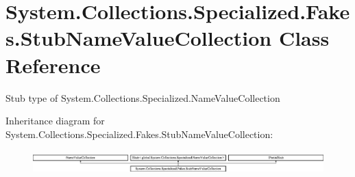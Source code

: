 \hypertarget{class_system_1_1_collections_1_1_specialized_1_1_fakes_1_1_stub_name_value_collection}{\section{System.\-Collections.\-Specialized.\-Fakes.\-Stub\-Name\-Value\-Collection Class Reference}
\label{class_system_1_1_collections_1_1_specialized_1_1_fakes_1_1_stub_name_value_collection}
}


Stub type of System.\-Collections.\-Specialized.\-Name\-Value\-Collection 


Inheritance diagram for System.\-Collections.\-Specialized.\-Fakes.\-Stub\-Name\-Value\-Collection\-:\begin{figure}[H]
\begin{center}
\leavevmode
\includegraphics[height=0.910569cm]{class_system_1_1_collections_1_1_specialized_1_1_fakes_1_1_stub_name_value_collection}
\end{center}
\end{figure}
